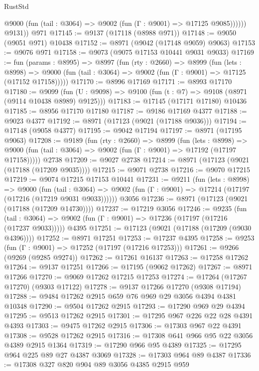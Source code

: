 \begin{lexlean}{RustStd}
\begin{coremodule}
              @9000 (fun (tail : @3064) => @9002 (fun (Γ : @9001) => @17125 @9085))))))
        @9131))
    @971
@17145 := @9137 (@17118 (@8988 @971))
@17148 := @9050 (@9051 @971) @10438
@17152 := @8971 (@9042 (@17148 @9059) @9063)
@17153 := @9076 @971
@17158 := @9073 (@9075 @17153 @10441 @9031 @9033)
@17169 := fun (params : @8995) =>
  @8997
    (fun (rty : @2660) =>
    @8999
      (fun (lets : @8998) =>
      @9000 (fun (tail : @3064) => @9002 (fun (Γ : @9001) => @17125 (@17152 @17158)))))
@17170 := @8996 @17169
@17171 := @8993 @17170
@17180 := @9099
    (fun (U : @9098) => @9100 (fun (t : @7) => @9108 (@8971 (@9114 @10438 @8989) @9125)))
@17183 := @17145 (@17171 @17180) @10436
@17185 := @8956 @17170 @17180
@17187 := @9186 @17169 @4377
@17188 := @9023 @4377
@17192 := @8971 (@17123 (@9021 (@17188 @9036)))
@17194 := @17148 (@9058 @4377)
@17195 := @9042 @17194
@17197 := @8971 (@17195 @9063)
@17208 := @9189
    (fun (rty : @2660) =>
    @8999
      (fun (lets : @8998) =>
      @9000 (fun (tail : @3064) => @9002 (fun (Γ : @9001) => @17192 (@17197 @17158)))))
    @2738
@17209 := @9027 @2738
@17214 := @8971 (@17123 (@9021 (@17188 (@17209 @9035))))
@17215 := @9071 @2738
@17216 := @9070 @17215
@17219 := @9074 @17215 @17153 @10441
@17231 := @9211
    (fun (lets : @8998) =>
    @9000
      (fun (tail : @3064) =>
      @9002 (fun (Γ : @9001) => @17214 (@17197 (@17216 (@17219 @9031 @9033))))))
    @3056
@17236 := @8971 (@17123 (@9021 (@17188 (@17209 @14730))))
@17237 := @17219 @3056
@17246 := @9235
    (fun (tail : @3064) => @9002 (fun (Γ : @9001) => @17236 (@17197 (@17216 (@17237 @9033)))))
    @4395
@17251 := @17123 (@9021 (@17188 (@17209 (@9030 @4396))))
@17252 := @8971 @17251
@17253 := @17237 @4395
@17258 := @9253 (fun (Γ : @9001) => @17252 (@17197 (@17216 @17253)))
@17261 := @9266 (@9269 (@9285 @9274))
@17262 := @17261 @16137
@17263 := @17258 @17262
@17264 := @9137 @17251
@17266 := @17195 (@9062 @17262)
@17267 := @8971 @17266
@17270 := @9069 @17262 @17215 @17253
@17274 := @17264 (@17267 @17270) (@9303 @17122)
@17278 := @9137 @17266 @17270 (@9308 @17194)
@17288 := @9484 @17262 @2915 @659 @76 @969 @29 @3056 @4394 @4381 @10348
@17290 := @9504 @17262 @2915
@17293 := @17290 @969 @29 @4394
@17295 := @9513 @17262 @2915
@17301 := @17295 @967 @226 @22 @28 @4391 @4393
@17303 := @9475 @17262 @2915
@17306 := @17303 @967 @22 @4391
@17308 := @9528 @17262 @2915
@17316 := @17308 @641 @966 @95 @22 @3056 @4389 @2915 @1364
@17319 := @17290 @966 @95 @4389
@17325 := @17295 @964 @225 @89 @27 @4387 @3069
@17328 := @17303 @964 @89 @4387
@17336 := @17308 @327 @820 @904 @89 @3056 @4385 @2915 @959

\end{coremodule}
\end{lexlean}

